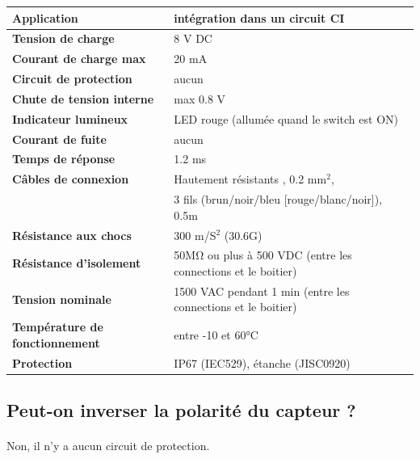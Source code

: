 \documentclass{article}
\begin{document}
\begin{table}[H]
    \begin{center}
        \begin{tabular}{l l}
            \textbf{Application} & intégration dans un circuit CI\\
            \hline
            \textbf{Tension de charge} & 8 V DC\\
            \hline
            \textbf{Courant de charge max} & 20 mA\\
            \hline
            \textbf{Circuit de protection} & aucun\\
            \hline
            \textbf{Chute de tension interne} & max 0.8 V\\
            \hline
            \textbf{Indicateur lumineux} & LED rouge (allumée quand le switch est ON)\\
            \hline
            \textbf{Courant de fuite} & aucun\\
            \hline
            \textbf{Temps de réponse} & 1.2 ms\\
            \hline
            \textbf{Câbles de connexion} & Hautement résistants \diameter 3.4, 0.2 $\si{\milli\meter^2}$, \\
            & 3 fils (brun/noir/bleu [rouge/blanc/noir]), 0.5m\\
            \hline
            \textbf{Résistance aux chocs} & 300 \si{\meter}/S$^2$ (30.6G)\\
            \hline
            \textbf{Résistance d'isolement} & 50\si{\mega\ohm} ou plus à 500 VDC (entre les connections et le boitier)\\
            \hline
            \textbf{Tension nominale} & 1500 VAC pendant 1 min (entre les connections et le boitier)\\
            \hline
            \textbf{Température de fonctionnement} & entre -10 et 60\si{\celsius}\\
            \hline
            \textbf{Protection} & IP67 (IEC529), étanche (JISC0920)\\
        \end{tabular}
    \end{center}
\end{table}

\subsection{Peut-on inverser la polarité du capteur ?}
\paragraph{}
Non, il n'y a aucun circuit de protection.
\end{document}
